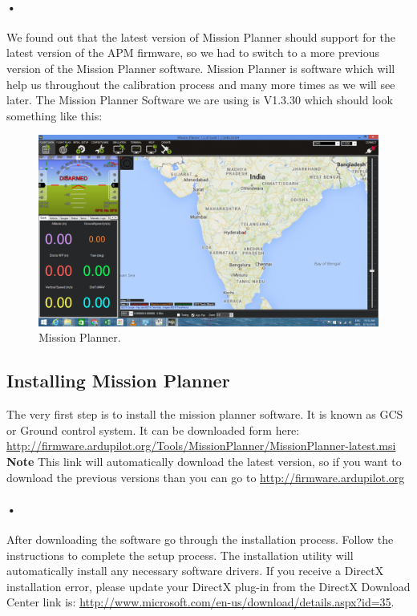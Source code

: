 \documentclass[11pt,a4paper]{article}
\begin{document}
	 \paragraph{•}We found out that the latest version of Mission Planner should support for the latest version of the APM firmware, so we had to switch to a more previous version of the Mission Planner software. Mission Planner is software which will help us throughout the calibration process and many more times as we will see later. The Mission Planner Software we are using is V1.3.30 which should look something like this: 
	 \begin{figure}[H]
	 	\centering
		\includegraphics[scale=0.35]{mission}
	 	\caption{Mission Planner.}
\end{figure}
	 \subsection{Installing Mission Planner}
	 The very first step is to install the mission planner software. It is known as GCS or Ground control system. It can be downloaded form here: \url{http://firmware.ardupilot.org/Tools/MissionPlanner/MissionPlanner-latest.msi} \textbf{Note} This link will automatically download the latest version, so if you want to download the previous versions than you can go to \url{http://firmware.ardupilot.org}
	 \paragraph{•}After downloading the software go through the installation process. Follow the instructions to complete the setup process. The installation utility will automatically install any necessary software drivers. If you receive a DirectX installation error, please update your DirectX plug-in from the DirectX Download Center link is: \url{http://www.microsoft.com/en-us/download/details.aspx?id=35}.
\end{document}
